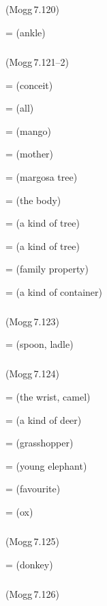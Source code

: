 \subparagraph*{} (Mogg\,7.120)\label{pacckx:pha}

 =  (ankle)\par

\subparagraph*{} (Mogg\,7.121--2)\label{pacckx:ba}

 =  (conceit)\par
{} =  (all)\par
{} =  (mango)\par
{} =  (mother)\par
{} =  (margosa tree)\par
{} =  (the body)\par
{} =  (a kind of tree)\par
{} =  (a kind of tree)\par
{} =  (family property)\par
{} =  (a kind of container)\par

\subparagraph*{} (Mogg\,7.123)\label{pacckx:bi}

 =  (spoon, ladle)\par

\subparagraph*{} (Mogg\,7.124)\label{pacckx:abha}

 =  (the wrist, camel)\par
{} =  (a kind of deer)\par
{} =  (grasshopper)\par
{} =  (young elephant)\par
{} =  (favourite)\par
{} =  (ox)\par

\subparagraph*{} (Mogg\,7.125)\label{pacckx:rabha}

 =  (donkey)\par

\subparagraph*{} (Mogg\,7.126)\label{pacckx:kabha}

